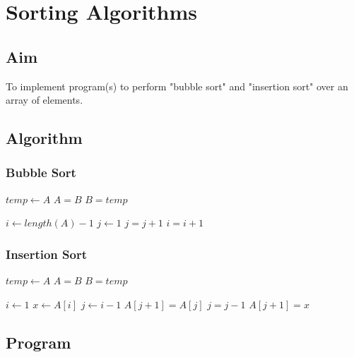 \chapter{Sorting Algorithms}

\section{Aim}

{\Large\color{white}
To implement program(s) to perform "bubble sort" and "insertion sort" over an array of elements.
\color{black}}

\section{Algorithm}

\subsection{Bubble Sort}
{\Large\color{white}
\begin{algorithmic}[1]
		\State $temp \gets A$
		\State $A = B$
		\State $B = temp$
	\EndFunction

		\State $i \gets length(A) - 1$
			\State $j \gets 1$
					\State {}
				\EndIf
				\State $j = j + 1$
			\EndWhile
			\State $i = i + 1$
		\EndWhile
	\EndFunction
\end{algorithmic}
\color{black}}

\subsection{Insertion Sort}
{\Large\color{white}
\begin{algorithmic}[1]
		\State $temp \gets A$
		\State $A = B$
		\State $B = temp$
	\EndFunction

		\State $i \gets 1$
			\State $x \gets A[i]$
			\State $j \gets i-1$
				\State $A[j+1] = A[j]$
				\State $j = j - 1$
			\EndWhile
			\State $A[j+1] = x$
		\EndWhile
	\EndFunction
\end{algorithmic}
\color{black}}

\section{Program}

